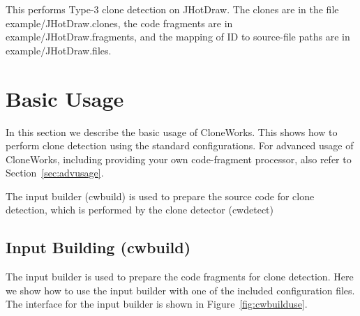 \documentclass[]{article}
\begin{document}
	This performs Type-3 clone detection on JHotDraw.  The clones are in the file
	example/JHotDraw.clones, the code fragments are in example/JHotDraw.fragments,
	and the mapping of ID to source-file paths are in example/JHotDraw.files.
	
\section{Basic Usage}
	In this section we describe the basic usage of CloneWorks. This shows how to perform clone detection using the standard configurations.  For advanced usage of CloneWorks, including providing your own code-fragment processor, also refer to Section~\ref{sec:advusage}.
	
	The input builder (cwbuild) is used to prepare the source code for clone detection, which is performed by the clone detector (cwdetect)
	
	\subsection{Input Building (cwbuild)}
	The input builder is used to prepare the code fragments for clone detection.  Here we show how to use the input builder with one of the included configuration files.  The interface for the input builder is shown in Figure~\ref{fig:cwbuilduse}.
		
\end{document}
